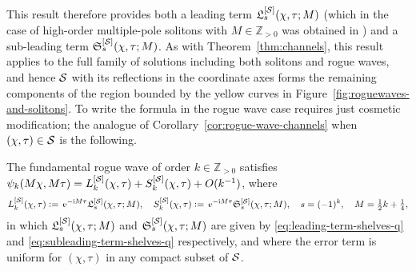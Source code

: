 This result therefore provides both a leading term $\mathfrak{L}_s^{[\mathcal{S}]}(\chi,\tau;M)$ (which in the case of high-order multiple-pole solitons with $M\in\mathbb{Z}_{>0}$ was obtained in \cite{BilmanBW19}) and a sub-leading term $\mathfrak{S}_s^{[\mathcal{S}]}(\chi,\tau;M)$.  As with Theorem~\ref{thm:channels}, this result applies to the full family of solutions including both solitons and rogue waves, and hence $\mathcal{S}$ with its reflections in the coordinate axes forms the remaining components of the region bounded by the yellow curves in Figure~\ref{fig:roguewaves-and-solitons}.  To write the formula in the rogue wave case requires just cosmetic modification; the analogue of Corollary~\ref{cor:rogue-wave-channels} when $(\chi,\tau)\in\mathcal{S}$ is the following.
\begin{corollary}
The fundamental rogue wave of order $k\in\mathbb{Z}_{>0}$ satisfies $\psi_k(M\chi,M\tau)=L_k^{[\mathcal{S}]}(\chi,\tau)+S_k^{[\mathcal{S}]}(\chi,\tau)+O(k^{-1})$, where
\begin{equation}
L_k^{[\mathcal{S}]}(\chi,\tau)\vcentcolon=\,\mathrm{e}^{-\mathrm{i} M\tau}\mathfrak{L}_s^{[\mathcal{S}]}(\chi,\tau;M),\quad
S_k^{[\mathcal{S}]}(\chi,\tau)\vcentcolon=\,\mathrm{e}^{-\mathrm{i} M\tau}\mathfrak{S}_s^{[\mathcal{S}]}(\chi,\tau;M),\quad
s=(-1)^k,\quad M=\tfrac{1}{2}k+\tfrac{1}{4},
\label{eq:rw-terms-shelves}
\end{equation}
in which $\mathfrak{L}_s^{[\mathcal{S}]}(\chi,\tau;M)$ and $\mathfrak{S}_s^{[\mathcal{S}]}(\chi,\tau;M)$ are given by \eqref{eq:leading-term-shelves-q} and \eqref{eq:subleading-term-shelves-q} respectively, and
where the error term is uniform for $(\chi,\tau)$ in any compact subset of $\mathcal{S}$.
\label{cor:rogue-wave-shelves}
\end{corollary}


